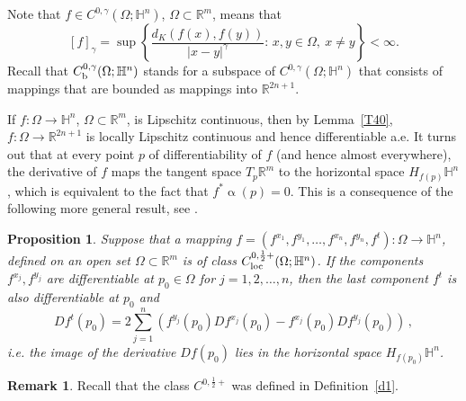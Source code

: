 \documentclass[intlimits,12pt,reqno]{amsart}
\newcommand{\bbbh}{\mathbb H}
\newcommand{\R}{\mathbb R}
\numberwithin{equation}{section}
\newtheorem{proposition}[theorem]{Proposition}
\theoremstyle{definition}
\newtheorem{remark}[theorem]{Remark}
\begin{document}
Note that $f\in C^{0,\gamma}(\Omega;\bbbh^n)$, $\Omega\subset\R^m$, means that 
\begin{equation}
\label{eq41}
[f]_{\gamma}=
\sup\left\{\frac{d_K(f(x),f(y))}{|x-y|^\gamma}:\, x,y\in\Omega,\ x\neq y\right\}<\infty.
\end{equation}
Recall that $C_{\rm b}^{0,\gamma}(\Omega;\bbbh^n)$ stands for a subspace of $C^{0,\gamma}(\Omega;\bbbh^n)$ that consists of mappings that are bounded as mappings into $\R^{2n+1}$.



If $f:\Omega\to\bbbh^n$, $\Omega\subset\R^m$, is Lipschitz continuous, then by Lemma~\ref{T40}, $f:\Omega\to\R^{2n+1}$ is locally Lipschitz continuous and hence differentiable a.e. It turns out that at every point $p$ of differentiability of $f$ (and hence almost everywhere), the derivative of $f$ maps the tangent space $T_p\R^m$ to the horizontal space  $H_{f(p)}\bbbh^n$, which is equivalent to the fact that $f^*\upalpha(p)=0$.
This is a consequence of the following more general result, see \cite[Proposition~8.1]{BHW}.
\begin{proposition}
\label{T42}
Suppose that a mapping
$f=(f^{x_1},f^{y_1},\ldots,f^{x_n},f^{y_n},f^t):\Omega\to\bbbh^n$, defined on an open set $\Omega\subset\R^m$
is of class $C^{0,\frac{1}{2}+}_{\rm loc}(\Omega;\bbbh^n)$. If the components
$f^{x_j}, f^{y_j}$ are differentiable at $p_0\in\Omega$ for $j=1,2,\ldots,n$, then
the last component $f^t$ is also differentiable at $p_0$ and
$$
Df^t(p_0) = 2\sum_{j=1}^n
\left( f^{y_j}(p_0)Df^{x_j}(p_0)-f^{x_j}(p_0)Df^{y_j}(p_0)\right)\, ,
$$
i.e. the image of the derivative $Df(p_0)$ lies in the horizontal space $H_{f(p_0)}\bbbh^n$.
\end{proposition}
\begin{remark}
Recall that the class $C^{0,\frac{1}{2}+}$ was defined in Definition~\ref{d1}.
\end{remark}
\end{document}
